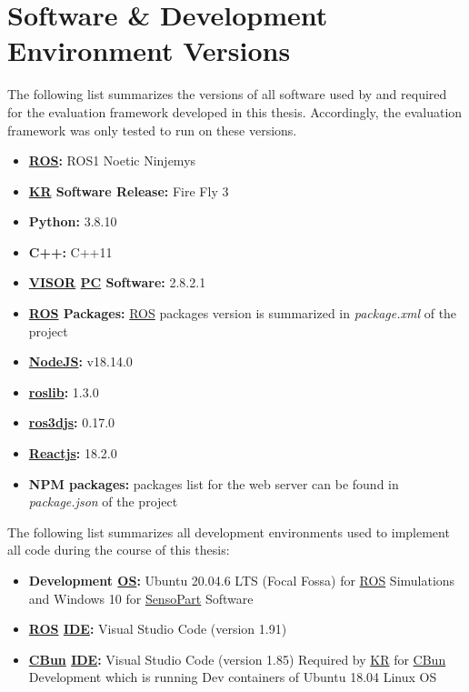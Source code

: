 \section{Software \& Development Environment Versions}
\label{sec:versions}

The following list summarizes the versions of all software used by and required for the
evaluation framework developed in this thesis. Accordingly, the evaluation framework
was only tested to run on these versions.

\begin{itemize}
    \item \textbf{\hyperref[acro:ROS]{ROS}:} ROS1 Noetic Ninjemys
    \item \textbf{\hyperref[acro:KR]{KR} Software Release:} Fire Fly 3
    \item \textbf{Python:} 3.8.10
    \item \textbf{C++:} C++11
    \item \textbf{\hyperref[acro:VISOR]{VISOR\textsuperscript{\textregistered}} \hyperref[acro:PC]{PC} Software:} 2.8.2.1
    \item \textbf{\hyperref[acro:ROS]{ROS} Packages:} \hyperref[acro:ROS]{ROS} packages version is summarized in \textit{package.xml} of the project
    \item \textbf{\hyperref[par:nodejs]{NodeJS}:} v18.14.0
    \item \textbf{\hyperref[par:roslibjs]{roslib}:} 1.3.0
    \item \textbf{\hyperref[par:ros3djs]{ros3djs}:} 0.17.0
    \item \textbf{\hyperref[par:reactjs]{Reactjs}:} 18.2.0
    \item \textbf{NPM packages:} packages list for the web server can be found in \textit{package.json} of the project
\end{itemize}

The following list summarizes all development environments used to implement all code
during the course of this thesis:

\begin{itemize}
    \item \textbf{Development \hyperref[acro:OS]{OS}:} Ubuntu 20.04.6 LTS (Focal Fossa) for \hyperref[acro:ROS]{ROS} Simulations and Windows 10 for \hyperref[acro:SensoPart]{SensoPart} Software
    \item \textbf{\hyperref[acro:ROS]{ROS} \hyperref[acro:IDE]{IDE}:} Visual Studio Code (version 1.91)
    \item \textbf{\hyperref[acro:CBun]{CBun} \hyperref[acro:IDE]{IDE}:} Visual Studio Code (version 1.85) Required by \hyperref[acro:KR]{KR} for \hyperref[acro:CBun]{CBun} Development which is running Dev containers of Ubuntu 18.04 Linux OS
\end{itemize}

\newpage